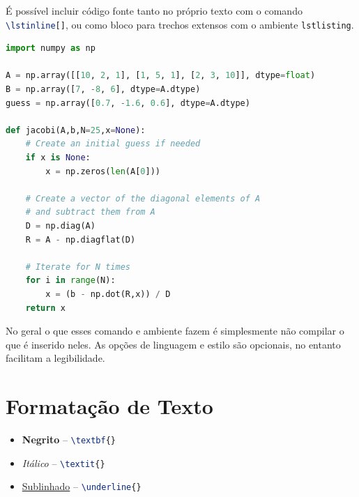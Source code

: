     É possível incluir código fonte tanto no próprio texto com o comando \lstinline[language=TeX,style=Code]|\lstinline[]|, ou como bloco para trechos extensos com o ambiente \lstinline[language=TeX,style=Code]|lstlisting|.


\begin{lstlisting}[language=Python, style=Code]
import numpy as np

A = np.array([[10, 2, 1], [1, 5, 1], [2, 3, 10]], dtype=float)
B = np.array([7, -8, 6], dtype=A.dtype)
guess = np.array([0.7, -1.6, 0.6], dtype=A.dtype)

def jacobi(A,b,N=25,x=None):
    # Create an initial guess if needed                                                                                                                                                            
    if x is None:
        x = np.zeros(len(A[0]))

    # Create a vector of the diagonal elements of A                                                                                                                                                
    # and subtract them from A                                                                                                                                                                     
    D = np.diag(A)
    R = A - np.diagflat(D)

    # Iterate for N times                                                                                                                                                                          
    for i in range(N):
        x = (b - np.dot(R,x)) / D
    return x
\end{lstlisting}

    No geral o que esses comando e ambiente fazem é simplesmente não compilar o que é inserido neles.
    As opções de linguagem e estilo são opcionais, no entanto facilitam a legibilidade.


\section{Formatação de Texto}
\label{sec:formatacao}

    \begin{itemize}
        \item \textbf{Negrito} -- \lstinline[language=TeX,style=code]|\textbf{}|
        \item \textit{Itálico} -- \lstinline[language=TeX,style=code]|\textit{}|
        \item \underline{Sublinhado} -- \lstinline[language=TeX,style=code]|\underline{}|
    \end{itemize}

